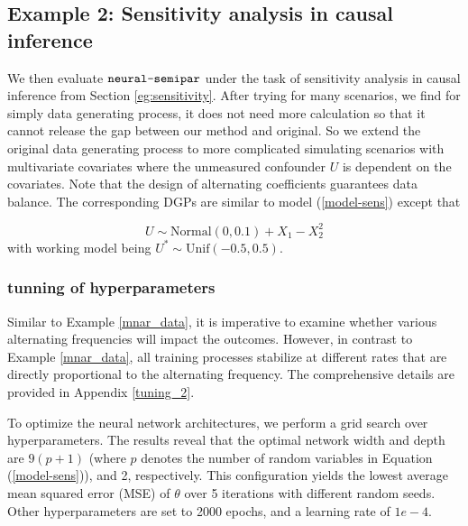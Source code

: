 \documentclass[11pt]{article}
\def\neurosemi{{\normalfont\texttt{neural-semipar}}}
\begin{document}
\subsection{Example 2: Sensitivity analysis in causal inference}
\label{sec:sensitivity}

We then evaluate $\neurosemi$ under the task of sensitivity analysis in causal inference from Section \ref{eg:sensitivity}. After trying for many scenarios, we find for simply data generating process, it does not need more calculation so that it cannot release the gap between our method and original. So we extend the original data generating process to more complicated simulating scenarios with  multivariate covariates where the unmeasured confounder $U$ is dependent on the covariates. Note that the design of alternating coefficients guarantees data balance. The corresponding DGPs are similar to model (\ref{model-sens}) except that 

\begin{equation}
\label{eq:model-sens-depU}
U \sim \text{Normal} (0, 0.1) + X_1 - X_2 ^2 
\end{equation}
with working model being $U^{*} \sim \text{Unif}(-0.5,0.5)$. 

\subsubsection{tunning of hyperparameters}

Similar to Example \ref{mnar_data}, it is imperative to examine whether various alternating frequencies will impact the outcomes. However, in contrast to Example \ref{mnar_data}, all training processes stabilize at different rates that are directly proportional to the alternating frequency. The comprehensive details are provided in Appendix \ref{tuning_2}.

To optimize the neural network architectures, we perform a grid search over hyperparameters. The results reveal that the optimal network width and depth are $9(p+1)$ (where $p$ denotes the number of random variables in Equation (\ref{model-sens})), and 2, respectively. This configuration yields the lowest average mean squared error (MSE) of $\theta$ over 5 iterations with different random seeds. Other hyperparameters are set to 2000 epochs, and a learning rate of $1e-4$.
\end{document}
